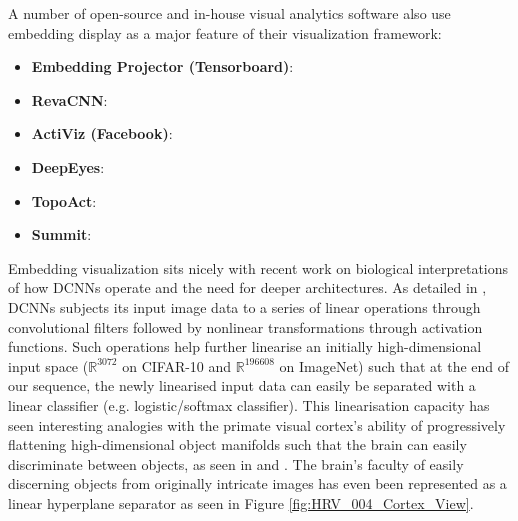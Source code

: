 A number of open-source and in-house visual analytics software also use embedding display as a major feature of their visualization framework:

\begin{itemize}
	\item \textbf{Embedding Projector (Tensorboard)}: \cite{Smilkov2016EmbeddingPI}
	\item \textbf{RevaCNN}: \cite{ChungReVACNN2016}
	\item \textbf{ActiViz (Facebook)}: \cite{Kahng2018ActiVisVE}
	\item \textbf{DeepEyes}: \cite{Pezzotti2018DeepEyesPV}
	\item \textbf{TopoAct}: \cite{Rathore2019TopoActET}
	\item \textbf{Summit}: \cite{hohman2020summit}
\end{itemize}

Embedding visualization sits nicely with recent work on biological interpretations of how DCNNs operate and the need for deeper architectures. As detailed in \cite{Mallat2016UnderstandingDC}, DCNNs subjects its input image data to a series of linear operations through convolutional filters followed by nonlinear transformations through activation functions. Such operations help further linearise an initially high-dimensional input space ($\mathbb{R}^{3072}$ on CIFAR-10 and $\mathbb{R}^{196608}$ on ImageNet) such that at the end of our sequence, the newly linearised input data can easily be separated with a linear classifier (e.g. logistic/softmax classifier). This linearisation capacity has seen interesting analogies with the primate visual cortex's ability of progressively flattening high-dimensional object manifolds such that the brain can easily discriminate between objects, as seen in \cite{DiCarlo2007UntanglingIO} and \cite{Cohen2020SeparabilityAG}. The brain's faculty of easily discerning objects from originally intricate images has even been represented as a linear hyperplane separator as seen in Figure \ref{fig:HRV_004_Cortex_View}.

\vspace{0.2cm}

